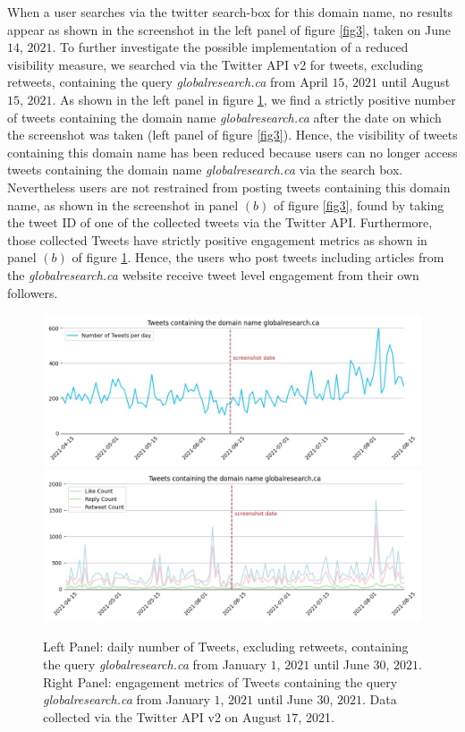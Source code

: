 \documentclass{article}
\begin{document}
When a user searches via the twitter search-box for this domain name, no results appear as shown in the screenshot in the left panel of figure \ref{fig3}, taken on June $14$, $2021$. To further investigate the possible implementation of a reduced visibility measure, we searched via the Twitter API v2 for tweets, excluding retweets, containing the query {\it globalresearch.ca} from April $15$, $2021$ until August $15$, $2021$.  As shown in the left panel in figure \ref{fig4}, we find a strictly positive number of tweets containing the domain name {\it globalresearch.ca} after the date on which the screenshot was taken (left panel of figure \ref{fig3}). Hence, the visibility of tweets containing this domain name has been reduced because users can no longer access tweets containing the domain name {\it globalresearch.ca} via the search box. Nevertheless users are not restrained from posting tweets containing this domain name, as shown in the screenshot in panel $(b)$ of figure \ref{fig3}, found by taking the tweet ID of one of the collected tweets via the Twitter API. Furthermore, those collected Tweets have strictly positive engagement metrics as shown in panel $(b)$ of figure \ref{fig4}. Hence, the users who post tweets including articles from the {\it globalresearch.ca} website receive tweet level engagement from their own followers. 

\begin{figure}[h]
\hspace{-2em}
		\includegraphics[scale=0.32]{../figure/globalresearch_domain_2021-08-17.jpg} 
		\includegraphics[scale=0.32]{../figure/globalresearch_domain_engagement_2021-08-17.jpg}
\caption{Left Panel: daily number of Tweets, excluding retweets, containing the query {\it globalresearch.ca} from January $1$, $2021$ until June $30$, $2021$. Right Panel: engagement metrics of Tweets containing the query {\it globalresearch.ca} from January $1$, $2021$ until June $30$, $2021$. Data collected via the Twitter API v2 on August $17$, 2021.   }
\label{fig4}
\end{figure}
\end{document}
